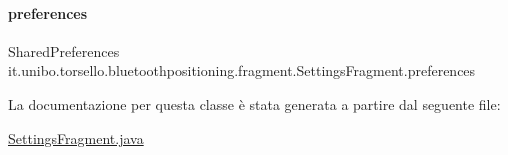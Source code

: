 \hypertarget{classit_1_1unibo_1_1torsello_1_1bluetoothpositioning_1_1fragment_1_1SettingsFragment_a52480c4d5d81ca59fe4a98ae3c623ea4_a52480c4d5d81ca59fe4a98ae3c623ea4}{}\label{classit_1_1unibo_1_1torsello_1_1bluetoothpositioning_1_1fragment_1_1SettingsFragment_a52480c4d5d81ca59fe4a98ae3c623ea4_a52480c4d5d81ca59fe4a98ae3c623ea4} 
\paragraph{\texorpdfstring{preferences}{preferences}}
{\footnotesize\ttfamily Shared\+Preferences it.\+unibo.\+torsello.\+bluetoothpositioning.\+fragment.\+Settings\+Fragment.\+preferences\hspace{0.3cm}{\ttfamily [private]}}



La documentazione per questa classe è stata generata a partire dal seguente file\+:\begin{DoxyCompactItemize}
\item 
\hyperlink{SettingsFragment_8java}{Settings\+Fragment.\+java}\end{DoxyCompactItemize}
